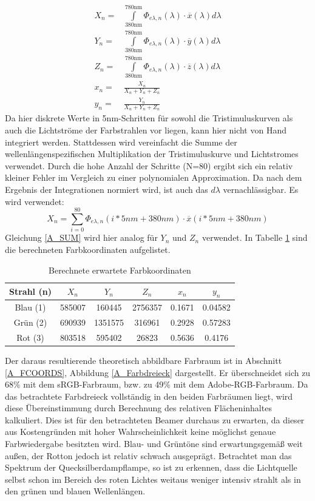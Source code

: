 \begin{eqnarray*}
X_n = & \int\limits_{\mbox{380nm}}^{\mbox{780nm}} \Phi_{e\lambda,n}(\lambda)\cdot \overline{x}(\lambda)d\lambda \\
Y_n = & \int\limits_{\mbox{380nm}}^{\mbox{780nm}} \Phi_{e\lambda,n}(\lambda)\cdot \overline{y}(\lambda)d\lambda \\
Z_n = & \int\limits_{\mbox{380nm}}^{\mbox{780nm}} \Phi_{e\lambda,n}(\lambda)\cdot \overline{z}(\lambda)d\lambda \\
x_n = & \frac{X_n}{X_n+Y_n+Z_n} \\
y_n = & \frac{Y_n}{X_n+Y_n+Z_n}
\end{eqnarray*}
Da hier diskrete Werte in 5nm-Schritten für sowohl die Tristimuluskurven als auch die Lichtströme der Farbstrahlen vor liegen, kann hier nicht von Hand integriert werden. Stattdessen wird vereinfacht die Summe der wellenlängenspezifischen Multiplikation der Tristimuluskurve und Lichtstromes verwendet. Durch die hohe Anzahl der Schritte (N=80) ergibt sich ein relativ kleiner Fehler im Vergleich zu einer polynomialen Approximation. Da nach dem Ergebnis der Integrationen normiert wird, ist auch das $d\lambda$ vernachlässigbar. Es wird verwendet:
\begin{equation}
X_n = \sum_{i=0}^{80} \Phi_{e\lambda,n}(i*5nm + 380nm) \cdot \overline{x}(i*5nm + 380nm)
\label{A_SUM}
\end{equation}
Gleichung \ref{A_SUM} wird hier analog für $Y_n$ und $Z_n$ verwendet. In Tabelle \ref{A_COORDS} sind die berechneten Farbkoordinaten aufgelistet.

\begin{table}[h]
\caption{Berechnete erwartete Farbkoordinaten}
\centering
\begin{tabular}{| c | c | c | c | c | c |}
\hline
Strahl (n) & $X_n$ & $Y_n$ & $Z_n$ & $x_n$ & $y_n$ \\
\hline
Blau (1) & 585007 & 160445 & 2756357 & 0.1671 & 0.04582 \\
Grün (2) & 690939 & 1351575 & 316961 & 0.2928 & 0.57283 \\
Rot (3) & 803518 & 595402 & 26823 & 0.5636 & 0.4176 \\
\hline
\end{tabular}

\label{A_COORDS}
\end{table}
Der daraus resultierende theoretisch abbildbare Farbraum ist in Abschnitt \ref{A_FCOORDS}, Abbildung \ref{A_Farbdreieck} dargestellt. Er überschneidet sich zu 68\% mit dem sRGB-Farbraum, bzw. zu 49\% mit dem Adobe-RGB-Farbraum. Da das betrachtete Farbdreieck vollständig in den beiden Farbräumen liegt, wird diese Übereinstimmung durch Berechnung des relativen Flächeninhaltes kalkuliert. Dies ist für den betrachteten Beamer durchaus zu erwarten, da dieser aus Kostengründen mit hoher Wahrscheinlichkeit keine möglichst genaue Farbwiedergabe besitzten wird. Blau- und Grüntöne sind erwartungsgemäß weit außen, der Rotton jedoch ist relativ schwach ausgeprägt. Betrachtet man das Spektrum der Quecksilberdampflampe, so ist zu erkennen, dass die Lichtquelle selbst schon im Bereich des roten Lichtes weitaus weniger intensiv strahlt als in den grünen und blauen Wellenlängen.